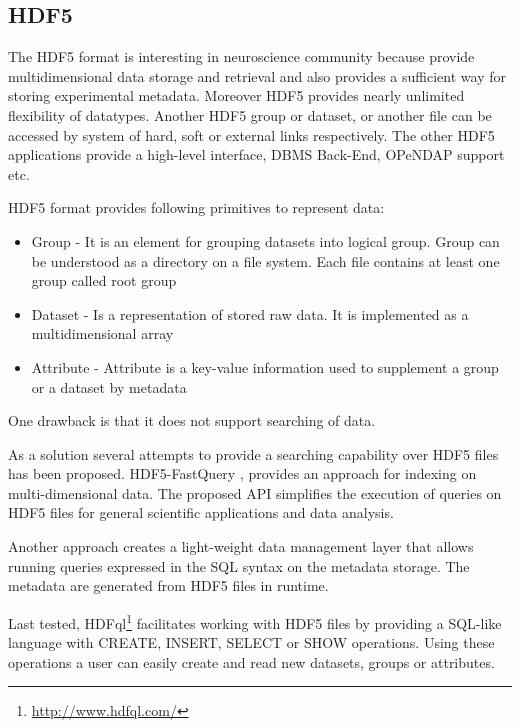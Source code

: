 \documentclass[utf8]{frontiersSCNS} %
\begin{document}
\subsection{HDF5}
\label{HDF5}

The HDF5 format is interesting in neuroscience community because provide multidimensional data storage and retrieval and also provides a sufficient way for storing experimental metadata. Moreover HDF5 provides nearly unlimited flexibility of datatypes. Another HDF5 group or dataset, or another file can be accessed by system of hard, soft or external links respectively. The other HDF5 applications \citep{Folk:2011:OHT:1966895.1966900} provide a high-level interface, DBMS Back-End, OPeNDAP support etc.


HDF5 format \citep{Koziol2011} provides following primitives to represent data:

\begin{itemize}
 \item Group - It is an element for grouping datasets into logical group. Group can be understood as a directory on a file system. Each file contains at least one group called root group
 \item Dataset - Is a representation of stored raw data. It is implemented as a multidimensional array 
 \item Attribute - Attribute is a key-value information used to supplement a group or a dataset by metadata
\end{itemize}

One drawback is that it does not support searching of data.


As a solution several attempts to provide a searching capability over HDF5 files has been proposed. HDF5-FastQuery \citep{1644309}, \citep{6114446} provides an approach for indexing on multi-dimensional data. The proposed API simplifies the execution of queries on HDF5 files for general scientific applications and data analysis.

Another approach \citep{6546110} creates a light-weight data management layer that allows running queries expressed in the SQL syntax on the metadata storage. The metadata are generated from HDF5 files in runtime.

Last tested, HDFql\footnote{\url{http://www.hdfql.com/}} facilitates working with HDF5 files by providing a SQL-like language with CREATE, INSERT, SELECT or SHOW operations. Using these operations a user can easily create and read new datasets, groups or attributes. 
\end{document}
